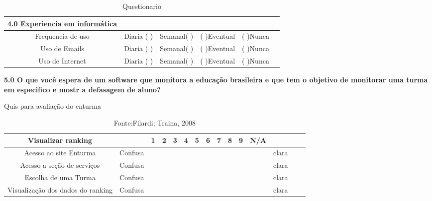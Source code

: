 \begin{itemize}
		\begin{table}
		\centering
		\begin{tabular}{|c|c|c|c|c|c|} 

		\hline
			\textbf{4.0 Experiencia em informática}\\ 
		\hline
		   Frequencia de uso & Diaria ( ) & Semanal( ) & ( )Eventual & ( )Nunca &  \\
		\hline
		   Uso de Emails & Diaria ( ) & Semanal( ) & ( )Eventual & ( )Nunca &  \\
		\hline
			Uso de Internet& Diaria ( ) & Semanal( ) & ( )Eventual & ( )Nunca & \\
		\hline
		\end{tabular}
		\caption{Questionario}

		\end{table}


		\textbf{5.0 O que você espera de um software que monitora a educação brasileira e que tem o objetivo de monitorar uma turma em especifico e mostr a defasagem de aluno?}

		\begin{table}[H]
	{Quis para avaliação do enturma}
	\centering
	\begin{tabular}{|c|c|c|c|c|c|c|c|c|c|c|c|c|c|c|} 

		\hline
		   \textbf{Visualizar ranking} &  & 1 & 2 & 3 & 4 & 5 & 6 & 7 & 8 & 9 & N/A &  \\
		\hline
		   Acesso ao site Enturma & Confusa &  &  &  &  &  &  &  &  &  &  & clara \\ 
		\hline
		 Acesso a seção de serviços  & Confusa &  &  &  &  &  &  &  &  &  &  & clara \\ 
		\hline
		 Escolha de uma Turma  & Confusa &  &  &  &  &  &  &  &  &  &  & clara \\ 
		\hline
		 Visualização dos dados do ranking & Confusa &  &  &  &  &  &  &  &  &  &  & clara \\ 
		\hline
	\end{tabular}
	\caption {Fonte:Filardi; Traina, 2008}

\end{table}

\end{itemize}